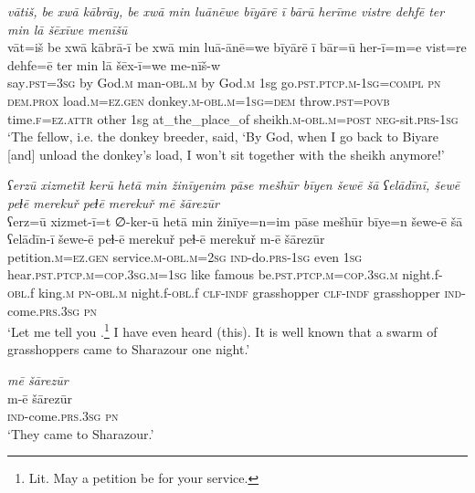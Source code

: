 \ea \label{HB.67}
\textit{vātiš, be xwā kābrāy, be xwā min luānēwe bīyārē ī bārū herīme vistre dehfē ter min lā šēxīwe menīšū} \\ 
\gll vāt=iš be xwā kābrā-ī be xwā min luā-ānē=we bīyārē ī bār=ū her-ī=m=e vist=re dehfe=ē ter min lā šēx-ī=we me-nīš-w \\ 
 say\textsc{.pst}\textsc{=3sg} by God\textsc{.m} man\textsc{-obl}\textsc{.m} by God\textsc{.m} 1sg go\textsc{.pst}\textsc{.ptcp}\textsc{.m}\textsc{-1sg}\textsc{=\textsc{compl}} \textsc{pn} \textsc{dem.prox} load\textsc{.m}\textsc{=ez}\textsc{.gen} donkey\textsc{.m}\textsc{-obl}\textsc{.m}\textsc{=1sg}\textsc{=dem} throw\textsc{.pst}\textsc{=\textsc{povb}} time\textsc{\textsc{.f}}\textsc{=ez}.\textsc{attr} other 1sg at\_the\_place\_of sheikh\textsc{.m}\textsc{-obl}\textsc{.m}\textsc{=\textsc{post}} \textsc{neg-}sit\textsc{.prs}\textsc{-1sg} \\ 
\glt `The fellow, i.e. the donkey breeder, said, ‘By God, when I go back to Biyare [and] unload the donkey’s load, I won’t sit together with the sheikh anymore!'
\z 
 
\ea \label{PM.1}
\textit{ʕerzū xizmetīt kerū hetā min žinīyenim pāse mešhūr bīyen šewē šā ʕelādīnī, šewē peɫē merekuř peɫē merekuř mē šārezūr} \\ 
\gll ʕerz=ū xizmet-ī=t ∅-ker-ū hetā min žinīye=n=im pāse mešhūr bīye=n šewe-ē šā ʕelādīn-ī šewe-ē peɫ-ē merekuř peɫ-ē merekuř m-ē šārezūr \\ 
 petition\textsc{.m}\textsc{\textsc{=ez.gen}} service\textsc{.m}\textsc{-obl}\textsc{.m}\textsc{=\textsc{2sg}} \textsc{ind-}do\textsc{.prs}\textsc{-\textsc{1sg}} even \textsc{1sg} hear\textsc{.pst}\textsc{.ptcp}\textsc{.m}\textsc{=cop}\textsc{.3sg}\textsc{.m}\textsc{=\textsc{1sg}} like famous be\textsc{.pst}\textsc{.ptcp}\textsc{.m}\textsc{=cop}\textsc{.3sg}\textsc{.m} night.f\textsc{-obl}.f king\textsc{.m} \textsc{pn}\textsc{-obl}\textsc{.m} night.f\textsc{-obl}.f \textsc{clf}\textsc{-indf} grasshopper \textsc{clf}\textsc{-indf} grasshopper \textsc{ind-}come\textsc{.prs}\textsc{.3sg} \textsc{pn} \\ 
\glt `Let me tell you .\footnote{Lit. May a petition be for your service.} I have even heard (this). It is well known that a swarm of grasshoppers came to Sharazour one night.'
\z 
 
\ea \label{PM.4}
\textit{mē šārezūr} \\ 
\gll m-ē šārezūr \\ 
 \textsc{ind-}come\textsc{.prs}\textsc{.3sg} \textsc{pn} \\ 
\glt `They came to Sharazour.'
\z 
 
